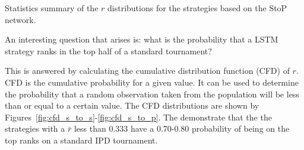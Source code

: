 \begin{table}[!htbp]
    \begin{center}
    \resizebox{.9\textwidth}{!}{
        
    }
\end{center}
\caption{Statistics summary of the \(r\) distributions for the strategies
based on the StoP network.}\label{table:statistic_summary_s_to_p}
\end{table}

An interesting question that arises is: what is the probability that a LSTM
strategy ranks in the top half of a standard tournament?

This is answered by calculating the cumulative distribution function (CFD) of
\(r\). CFD is the cumulative probability for a given value. It can be used to
determine the probability that a random observation taken from the population
will be less than or equal to a certain value. The CFD distributions are shown by
Figures~\ref{fig:cfd_s_to_s}-\ref{fig:cfd_s_to_p}. The demonstrate that the the
strategies with a \(\bar{r}\) less than 0.333 have a 0.70-0.80 probability of
being on the top ranks on a standard IPD tournament.

